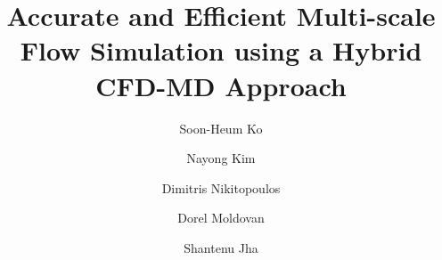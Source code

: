 \documentclass[preprint,12pt]{elsarticle}
\begin{document}
\begin{frontmatter}



\title{Accurate and Efficient Multi-scale Flow Simulation using a Hybrid CFD-MD Approach}
\author[add0,add1]{Soon-Heum Ko}
\author[add1]{Nayong Kim}
\author[add3]{Dimitris Nikitopoulos}
\author[add3]{Dorel Moldovan}
\author[add1,add2]{Shantenu Jha}
\address[add1]{Center for Computation \& Technology, Louisiana State University, Baton Rouge, LA 70803, USA}
\address[add0]{National Supercomputing Centre, Link\"{o}ping University, Link\"{o}ping, SE-581 83, Sweden}
\address[add2]{Department of Computer Science, Louisiana State University, Baton Rouge, LA 70803, USA}
\address[add3]{Department of Mechanical Engineering, Louisiana State University, Baton Rouge, LA 70803, USA}


\end{frontmatter}
\end{document}
